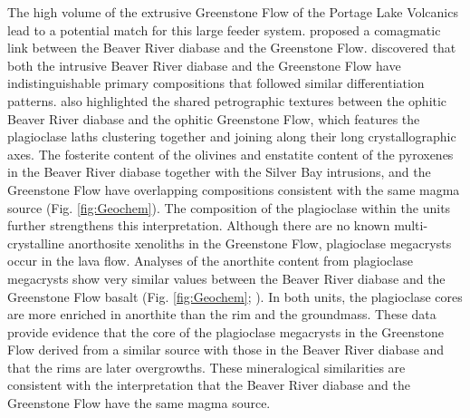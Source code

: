 \documentclass[draft]{agujournal2019}
\begin{document}
The high volume of the extrusive Greenstone Flow of the Portage Lake Volcanics lead to a potential match for this large feeder system.  proposed a comagmatic link between the Beaver River diabase and the Greenstone Flow.  discovered that both the intrusive Beaver River diabase and the Greenstone Flow have indistinguishable primary compositions that followed similar differentiation patterns.  also highlighted the shared petrographic textures between the ophitic Beaver River diabase and the ophitic Greenstone Flow, which features the plagioclase laths clustering together and joining along their long crystallographic axes. The fosterite content of the olivines and enstatite content of the pyroxenes in the Beaver River diabase together with the Silver Bay intrusions, and the Greenstone Flow have overlapping compositions consistent with the same magma source (Fig. \ref{fig:Geochem}). The composition of the plagioclase within the units further strengthens this interpretation. Although there are no known multi-crystalline anorthosite xenoliths in the Greenstone Flow, plagioclase megacrysts occur in the lava flow. Analyses of the anorthite content from plagioclase megacrysts show very similar values between the Beaver River diabase and the Greenstone Flow basalt (Fig. \ref{fig:Geochem}; ). In both units, the plagioclase cores are more enriched in anorthite than the rim and the groundmass. These data provide evidence that the core of the plagioclase megacrysts in the Greenstone Flow derived from a similar source with those in the Beaver River diabase and that the rims are later overgrowths. These mineralogical similarities are consistent with the interpretation that the Beaver River diabase and the Greenstone Flow have the same magma source. 
\end{document}
